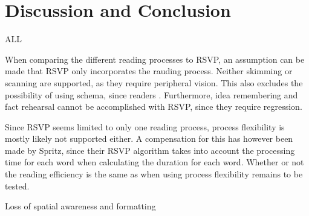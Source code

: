 \section{Discussion and Conclusion}
ALL

When comparing the different reading processes to RSVP, an assumption can be made that RSVP only incorporates the rauding process. Neither skimming or scanning are supported, as they require peripheral vision. This also excludes the possibility of using schema, since readers . Furthermore, idea remembering and fact rehearsal cannot be accomplished with RSVP, since they require regression. 

Since RSVP seems limited to only one reading process, process flexibility is mostly likely not supported either. A compensation for this has however been made by Spritz, since their RSVP algorithm takes into account the processing time for each word when calculating the duration for each word. Whether or not the reading efficiency is the same as when using process flexibility remains to be tested.

Loss of spatial awareness and formatting
